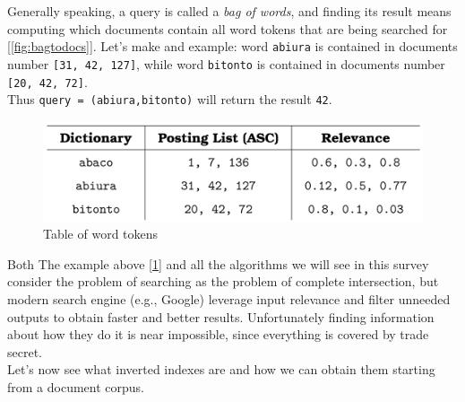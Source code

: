 Generally speaking, a query is called a \textit{bag of words}, and finding its result means computing which documents contain all word tokens that are being searched for [\ref{fig:bagtodocs}]. Let's make and example: word \verb+abiura+ is contained in documents number \verb+[31, 42, 127]+, while word \verb+bitonto+ is contained in documents number \verb+[20, 42, 72]+. \\
Thus \verb|query = (abiura,bitonto)| will return the result \verb+42+. \\

\begin{figure}[ht] 
\begin{center}
\includegraphics[width=.8\textwidth]{imgs/table_of_words.png}
\caption{Table of word tokens\label{fig:table_wtokens}}
\end{center}
\end{figure}

Both The example above [\ref{fig:table_wtokens}] and all the algorithms we will see in this survey consider the problem of searching as the problem of complete intersection, but modern search engine (e.g., Google)  leverage input relevance and filter unneeded outputs to obtain faster and better results. Unfortunately finding information about how they do it is near impossible, since everything is covered by trade secret. \\
Let's now see what inverted indexes are and how we can obtain them starting from a document corpus.

